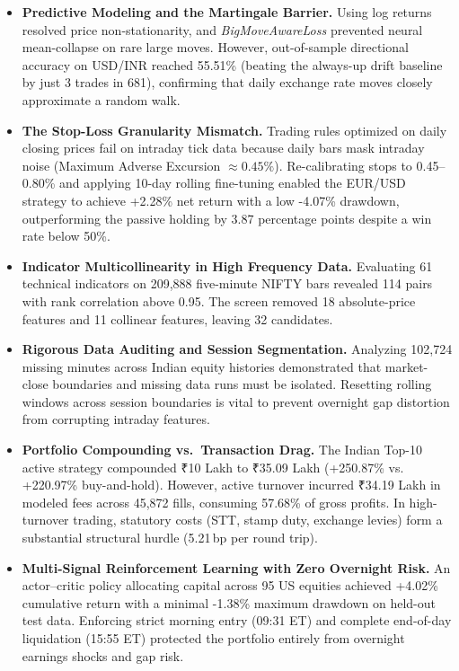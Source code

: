 \documentclass[12pt,a4paper,twoside,openany]{report}
\begin{document}
\begin{itemize}[leftmargin=1.5cm, itemsep=3pt]
  \item \textbf{Predictive Modeling and the Martingale Barrier.} Using log returns resolved price non-stationarity, and \textit{BigMoveAwareLoss} prevented neural mean-collapse on rare large moves. However, out-of-sample directional accuracy on USD/INR reached 55.51\% (beating the always-up drift baseline by just 3 trades in 681), confirming that daily exchange rate moves closely approximate a random walk.

  \item \textbf{The Stop-Loss Granularity Mismatch.} Trading rules optimized on daily closing prices fail on intraday tick data because daily bars mask intraday noise (Maximum Adverse Excursion $\approx 0.45\%$). Re-calibrating stops to 0.45--0.80\% and applying 10-day rolling fine-tuning enabled the EUR/USD strategy to achieve +2.28\% net return with a low -4.07\% drawdown, outperforming the passive holding by 3.87 percentage points despite a win rate below 50\%.

  \item \textbf{Indicator Multicollinearity in High Frequency Data.} Evaluating 61 technical indicators on 209,888 five-minute NIFTY bars revealed 114 pairs with rank correlation above 0.95. The screen removed 18 absolute-price features and 11 collinear features, leaving 32 candidates.

  \item \textbf{Rigorous Data Auditing and Session Segmentation.} Analyzing 102,724 missing minutes across Indian equity histories demonstrated that market-close boundaries and missing data runs must be isolated. Resetting rolling windows across session boundaries is vital to prevent overnight gap distortion from corrupting intraday features.

  \item \textbf{Portfolio Compounding vs.\ Transaction Drag.} The Indian Top-10 active strategy compounded ₹10 Lakh to ₹35.09 Lakh (+250.87\% vs. +220.97\% buy-and-hold). However, active turnover incurred ₹34.19 Lakh in modeled fees across 45,872 fills, consuming 57.68\% of gross profits. In high-turnover trading, statutory costs (STT, stamp duty, exchange levies) form a substantial structural hurdle (5.21\,bp per round trip).

  \item \textbf{Multi-Signal Reinforcement Learning with Zero Overnight Risk.} An actor--critic policy allocating capital across 95 US equities achieved +4.02\% cumulative return with a minimal -1.38\% maximum drawdown on held-out test data. Enforcing strict morning entry (09:31 ET) and complete end-of-day liquidation (15:55 ET) protected the portfolio entirely from overnight earnings shocks and gap risk.
\end{itemize}
\end{document}
